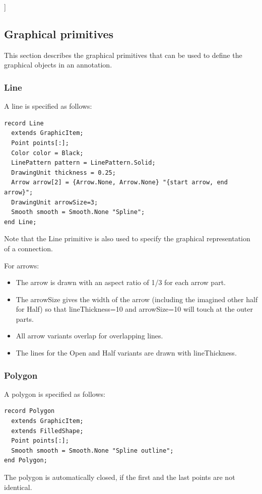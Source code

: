 \documentclass[10pt,a4paper]{report}
\def\doublelabel#1{\label{#1}\hypertarget{#1}{}}
\begin{document}
{]}

\subsection{Graphical primitives}\doublelabel{graphical-primitives}

This section describes the graphical primitives that can be used to
define the graphical objects in an annotation.

\subsubsection{Line}\doublelabel{line}

A line is specified as follows:

\begin{lstlisting}[language=modelica]
record Line
  extends GraphicItem;
  Point points[:];
  Color color = Black;
  LinePattern pattern = LinePattern.Solid;
  DrawingUnit thickness = 0.25;
  Arrow arrow[2] = {Arrow.None, Arrow.None} "{start arrow, end
arrow}";
  DrawingUnit arrowSize=3;
  Smooth smooth = Smooth.None "Spline";
end Line;
\end{lstlisting}
Note that the Line primitive is also used to specify the graphical
representation of a connection.

For arrows:

\begin{itemize}
\item
  The arrow is drawn with an aspect ratio of 1/3 for each arrow part.
\item
  The arrowSize gives the width of the arrow (including the imagined
  other half for Half) so that lineThickness=10 and arrowSize=10 will
  touch at the outer parts.
\item
  All arrow variants overlap for overlapping lines.
\item
  The lines for the Open and Half variants are drawn with lineThickness.
\end{itemize}

\subsubsection{Polygon}\doublelabel{polygon}

A polygon is specified as follows:

\begin{lstlisting}[language=modelica]
record Polygon
  extends GraphicItem;
  extends FilledShape;
  Point points[:];
  Smooth smooth = Smooth.None "Spline outline";
end Polygon;
\end{lstlisting}
The polygon is automatically closed, if the first and the last points
are not identical.
\end{document}

